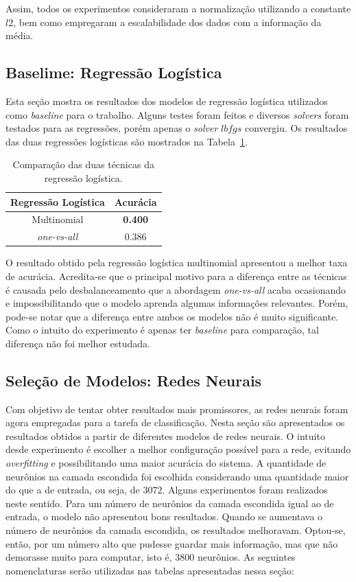 \documentclass[conference]{IEEEtran}
\begin{document}
Assim, todos os experimentos consideraram a normalização utilizando a constante $l2$, bem como empregaram a escalabilidade dos dados com a informação da média.

\subsection{Baselime: Regressão Logística}

Esta seção mostra os resultados dos modelos de regressão logística utilizados como \emph{baseline} para o trabalho. Alguns testes foram feitos e diversos \emph{solvers} foram testados para as regressões, porém apenas o \emph{solver} $lbfgs$ convergiu. Os resultados das duas regressões logísticas são mostrados na Tabela~\ref{tab:reg}.

\begin{table}[h!]
	\centering
	
	\begin{tabular}{cc} \toprule
		\textbf{Regressão Logística} & \textbf{Acurácia} \\ \toprule 	
		Multinomial		          & \textbf{0.400}    \\
		\emph{one-vs-all}         & 0.386             \\ \bottomrule
	\end{tabular}
	\caption{\small Comparação das duas técnicas da regressão logística.}
 	\label{tab:reg}
\end{table}

O resultado obtido pela regressão logística multinomial apresentou a melhor taxa de acurácia. Acredita-se que o principal motivo para a diferença entre as técnicas é causada pelo desbalanceamento que a abordagem \emph{one-vs-all} acaba ocasionando e impossibilitando que o modelo aprenda algumas informações relevantes. Porém, pode-se notar que a diferença entre ambos os modelos não é muito significante. Como o intuito do experimento é apenas ter \emph{baseline} para comparação, tal diferença não foi melhor estudada.


\subsection{Seleção de Modelos: Redes Neurais}

Com objetivo de tentar obter resultados mais promissores, as redes neurais foram agora empregadas para a tarefa de classificação. Nesta seção são apresentados os resultados obtidos a partir de diferentes modelos de redes neurais. O intuito desde experimento é escolher a melhor configuração possível para a rede, evitando \emph{overfitting} e possibilitando uma maior acurácia do sistema. A quantidade de neurônios na camada escondida foi escolhida considerando uma quantidade maior do que a de entrada, ou seja, de $3072$. Alguns experimentos foram realizados neste sentido. Para um número de neurônios da camada escondida igual ao de entrada, o modelo não apresentou bons resultados. Quando se aumentava o número de neurônios da camada escondida, os resultados melhoravam. Optou-se, então, por um número alto que pudesse guardar mais informação, mas que não demorasse muito para computar, isto é, $3800$ neurônios. As seguintes nomenclaturas serão utilizadas nas tabelas apresentadas nessa seção:
\end{document}
